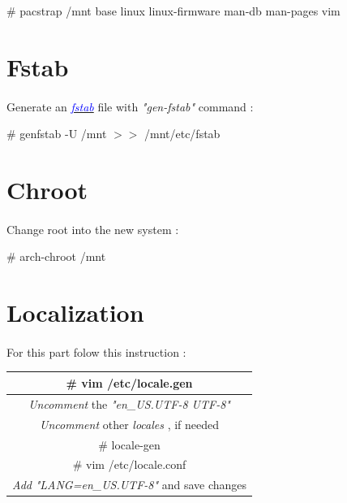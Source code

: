 \documentclass[12pt, a4paper]{article}
\begin{document}
\begin{center}
	\# pacstrap /mnt base linux linux-firmware man-db man-pages vim
\end{center}
 
 \section{Fstab}
 \paragraph{}
 Generate an \href{https://wiki.archlinux.org/index.php/Fstab}{\textcolor{blue}{\emph{fstab}}} file with \emph{"gen-fstab"} command :
 
 \begin{center}
 	\# genfstab -U /mnt $>>$ /mnt/etc/fstab
 \end{center}
 
 \section{Chroot}
 \paragraph{}
 Change root into the new system :
 
 \begin{center}
 	\# arch-chroot /mnt
 \end{center}

\section{Localization}
\paragraph{}
For this part folow this instruction :

\begin{center}
	\begin{tabular}{|c|} \hline
		\# vim /etc/locale.gen\\ \hline
		\textit{Uncomment} the \emph{"en\_US.UTF-8 UTF-8"}\\ \hline
		\textit{Uncomment} other \emph{locales} , if needed\\ \hline
		\# locale-gen\\ \hline
		\# vim /etc/locale.conf\\ \hline
		\emph{Add} \emph{"LANG=en\_US.UTF-8"} and save changes\\ \hline
	\end{tabular}
\end{center}
\end{document}
